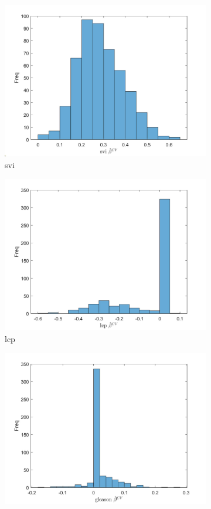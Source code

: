 \documentclass{article}
\begin{document}
	\begin{figure}[ht] 
		\begin{subfigure}[b]{0.5\linewidth}
			\centering
			\includegraphics[width=0.75\linewidth]{figures/q8_6.jpg} 
			\caption{svi} 
			\label{svi} 
			\vspace{2ex}
		\end{subfigure}%
		\begin{subfigure}[b]{0.5\linewidth}
			\centering
			\includegraphics[width=0.75\linewidth]{figures/q8_7.jpg} 
			\caption{lcp} 
			\label{lcp} 
			\vspace{2ex}
		\end{subfigure} 
		\begin{subfigure}[b]{0.5\linewidth}
			\centering
			\includegraphics[width=0.75\linewidth]{figures/q8_8.jpg} 

\end{subfigure}
\end{figure}
\end{document}
